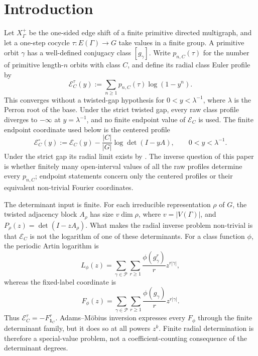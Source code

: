 \section{Introduction}
\label{sec:introduction}

Let \(X_\Gamma^+\) be the one-sided edge shift of a finite primitive directed
multigraph, and let a one-step cocycle \(\tau:E(\Gamma)\to G\) take values in a
finite group.  A primitive orbit \(\gamma\) has a well-defined conjugacy class
\([g_\gamma]\).  Write \(p_{n,C}(\tau)\) for the number of primitive
length-\(n\) orbits with class \(C\), and define its radial class Euler profile
by
\begin{equation}\label{eq:intro-class-euler-profile}
 \mathcal E_C^\tau(y)
 :=\sum_{n\ge1}p_{n,C}(\tau)\log(1-y^n).
\end{equation}
This converges without a twisted-gap hypothesis for
\(0<y<\lambda^{-1}\), where \(\lambda\) is the Perron root of the base.
Under the strict twisted gap, every raw class profile diverges to \(-\infty\)
at \(y=\lambda^{-1}\), and no finite endpoint value of \(\mathcal E_C\) is
used.  The finite endpoint coordinate used below is the
centered profile
\[
 \mathcal E_C^{\circ}(y)
 :=\mathcal E_C(y)-\frac{|C|}{|G|}\log\det(I-yA),
 \qquad 0<y<\lambda^{-1}.
\]
Under the strict gap its radial limit exists by
.  The inverse question of this paper is
whether finitely many open-interval values of all the raw profiles determine
every \(p_{n,C}\); endpoint statements concern only the centered profiles or
their equivalent non-trivial Fourier coordinates.

The determinant input is finite.  For each irreducible representation \(\rho\)
of \(G\), the twisted adjacency block \(A_\rho\) has size
\(v\dim\rho\), where \(v=|V(\Gamma)|\), and
\(P_\rho(z)=\det(I-zA_\rho)\).  What makes the radial inverse problem
non-trivial is that \(\mathcal E_C\) is not the logarithm of one of these
determinants.  For a class function \(\phi\), the periodic Artin logarithm is
\begin{equation}\label{eq:intro-artin}
 L_\phi(z)=\sum_{\gamma\in\mathcal P}\sum_{r\ge1}
   \frac{\phi(g_\gamma^r)}r z^{r|\gamma|},
\end{equation}
whereas the fixed-label coordinate is
\begin{equation}\label{eq:intro-fixed}
 F_\phi(z)=\sum_{\gamma\in\mathcal P}\sum_{r\ge1}
   \frac{\phi(g_\gamma)}r z^{r|\gamma|}.
\end{equation}
Thus \(\mathcal E_C^\tau=-F_{\mathbf1_C}^\tau\).  Adams--M\"obius
inversion expresses every \(F_\phi\) through the finite determinant family,
but it does so at all powers \(z^k\).  Finite radial determination is therefore
a special-value problem, not a coefficient-counting consequence of the
determinant degrees.

